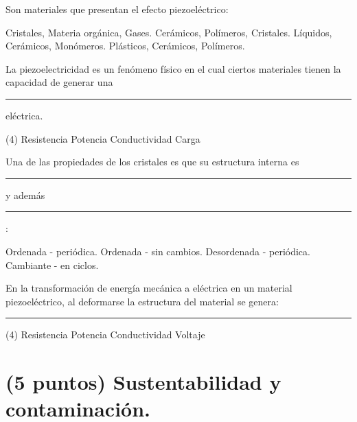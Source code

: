 \documentclass[12pt, letter]{exam}
\begin{document}
\begin{questions}
    \question Son materiales que presentan el efecto piezoeléctrico:
    \begin{multicols}{2}
    \begin{tasks}
        \task Cristales, Materia orgánica, Gases.
        \task Cerámicos, Polímeros, Cristales.
        \task Líquidos, Cerámicos, Monómeros.
        \task Plásticos, Cerámicos, Polímeros.
    \end{tasks}
    \end{multicols}
    \question La piezoelectricidad es un fenómeno físico en el cual ciertos materiales tienen la capacidad de generar una \rule{2cm}{0.1mm} eléctrica.
    \begin{tasks}(4)
        \task Resistencia
        \task Potencia
        \task Conductividad
        \task Carga
    \end{tasks}
    \question Una de las propiedades de los cristales es que su estructura interna es \rule{2cm}{0.1mm} y además \rule{2cm}{0.1mm}:
    \begin{multicols}{2}
        \begin{tasks}
            \task Ordenada - periódica.
            \task Ordenada - sin cambios.
            \task Desordenada - periódica.
            \task Cambiante - en ciclos.
        \end{tasks}
    \end{multicols}
    \question En la transformación de energía mecánica a eléctrica en un material piezoeléctrico, al deformarse la estructura del material se genera: \rule{2cm}{0.1mm}
    \begin{tasks}(4)
        \task Resistencia
        \task Potencia
        \task Conductividad
        \task Voltaje
    \end{tasks}
    
    \section{(5 puntos) Sustentabilidad y contaminación.}


\end{questions}
\end{document}
